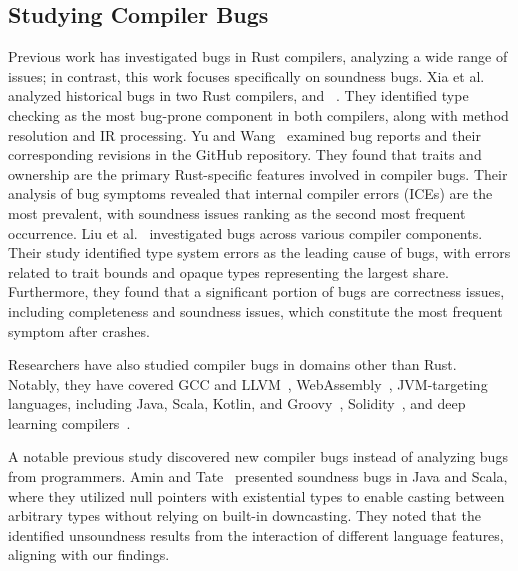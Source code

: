 \subsection{Studying Compiler Bugs}

Previous work has investigated bugs in Rust compilers, analyzing a wide range of
issues; in contrast, this work focuses specifically on soundness bugs.
%
Xia et al.~\cite{xia2023rustcompilers} analyzed historical bugs in two Rust
compilers, \rustc{} and ~\cite{rust-gcc}.
%
They identified type checking as the most bug-prone component in both compilers,
along with method resolution and IR processing.
%
Yu and Wang~\cite{yu2024empiricalrustpl} examined bug reports and their
corresponding revisions in the \rustc{} GitHub repository.
%
They found that traits and ownership are the primary Rust-specific features
involved in compiler bugs.
%
Their analysis of bug symptoms revealed that internal compiler errors (ICEs) are
the most prevalent, with soundness issues ranking as the second most frequent
occurrence.
%
Liu et al.~\cite{liu2025empiricala} investigated \rustc{} bugs across various
compiler components.
%
Their study identified type system errors as the leading cause of bugs, with
errors related to trait bounds and opaque types representing the largest share.
%
Furthermore, they found that a significant portion of bugs are correctness
issues, including completeness and soundness issues, which constitute the most
frequent symptom after crashes.

Researchers have also studied compiler bugs in domains other than Rust.
%
Notably, they have covered GCC and LLVM~\cite{sun2016gccllvm},
WebAssembly~\cite{romano2021wasm}, JVM-targeting languages, including Java,
Scala, Kotlin, and Groovy~\cite{chaliasos2021jvm},
Solidity~\cite{li2025solidity}, and deep learning compilers~\cite{du2021dl,
shen2021dlcompilerbugs}.

A notable previous study discovered new compiler bugs instead of analyzing bugs
from programmers.
%
Amin and Tate~\cite{amin2016java} presented soundness bugs in Java and Scala,
where they utilized null pointers with existential types to enable casting
between arbitrary types without relying on built-in downcasting.
%
They noted that the identified unsoundness results from the interaction of
different language features, aligning with our findings.


